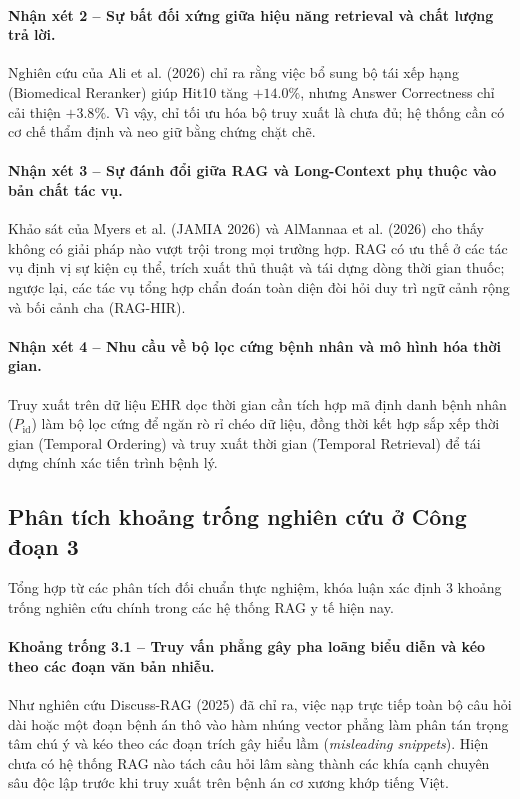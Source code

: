 \paragraph{Nhận xét 2 -- Sự bất đối xứng giữa hiệu năng retrieval và chất lượng trả lời.}
Nghiên cứu của Ali et al. (2026) chỉ ra rằng việc bổ sung bộ tái xếp hạng (Biomedical Reranker) giúp Hit\@10 tăng $+14.0\%$, nhưng Answer Correctness chỉ cải thiện $+3.8\%$. Vì vậy, chỉ tối ưu hóa bộ truy xuất là chưa đủ; hệ thống cần có cơ chế thẩm định và neo giữ bằng chứng chặt chẽ.

\paragraph{Nhận xét 3 -- Sự đánh đổi giữa RAG và Long-Context phụ thuộc vào bản chất tác vụ.}
Khảo sát của Myers et al. (JAMIA 2026) và AlMannaa et al. (2026) cho thấy không có giải pháp nào vượt trội trong mọi trường hợp. RAG có ưu thế ở các tác vụ định vị sự kiện cụ thể, trích xuất thủ thuật và tái dựng dòng thời gian thuốc; ngược lại, các tác vụ tổng hợp chẩn đoán toàn diện đòi hỏi duy trì ngữ cảnh rộng và bối cảnh cha (RAG-HIR).

\paragraph{Nhận xét 4 -- Nhu cầu về bộ lọc cứng bệnh nhân và mô hình hóa thời gian.}
Truy xuất trên dữ liệu EHR dọc thời gian cần tích hợp mã định danh bệnh nhân ($P_{\mathrm{id}}$) làm bộ lọc cứng để ngăn rò rỉ chéo dữ liệu, đồng thời kết hợp sắp xếp thời gian (Temporal Ordering) và truy xuất thời gian (Temporal Retrieval) để tái dựng chính xác tiến trình bệnh lý.

\subsection{Phân tích khoảng trống nghiên cứu ở Công đoạn 3}

Tổng hợp từ các phân tích đối chuẩn thực nghiệm, khóa luận xác định 3 khoảng trống nghiên cứu chính trong các hệ thống RAG y tế hiện nay.

\paragraph{Khoảng trống 3.1 -- Truy vấn phẳng gây pha loãng biểu diễn và kéo theo các đoạn văn bản nhiễu.}
Như nghiên cứu Discuss-RAG (2025) \cite{dong2025discuss} đã chỉ ra, việc nạp trực tiếp toàn bộ câu hỏi dài hoặc một đoạn bệnh án thô vào hàm nhúng vector phẳng làm phân tán trọng tâm chú ý và kéo theo các đoạn trích gây hiểu lầm (\emph{misleading snippets}). Hiện chưa có hệ thống RAG nào tách câu hỏi lâm sàng thành các khía cạnh chuyên sâu độc lập trước khi truy xuất trên bệnh án cơ xương khớp tiếng Việt.

